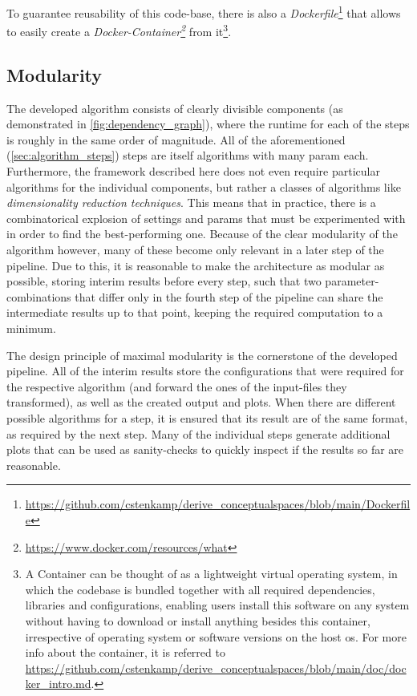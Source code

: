 To guarantee reusability of this code-base, there is also a \emph{Dockerfile}\footnote{{\url{https://github.com/cstenkamp/derive_conceptualspaces/blob/main/Dockerfile}}} that allows to easily create a \emph{Docker-Container\footnote{\url{https://www.docker.com/resources/what}}} from it\footnote{A Container can be thought of as a lightweight virtual operating system, in which the codebase is bundled together with all required dependencies, libraries and configurations, enabling users install this software on any system without having to download or install anything besides this container, irrespective of operating system or software versions on the host \acrshort{os}. For more info about the container, it is referred to \url{https://github.com/cstenkamp/derive_conceptualspaces/blob/main/doc/docker_intro.md}.}.

\subsection{Modularity}

The developed algorithm consists of clearly divisible components (as demonstrated in \autoref{fig:dependency_graph}), where the runtime for each of the steps is roughly in the same order of magnitude. All of the aforementioned (\autoref{sec:algorithm_steps}) steps are itself algorithms with many \gls{param} each. Furthermore, the framework described here does not even require particular algorithms for the individual components, but rather a classes of algorithms like \emph{dimensionality reduction techniques}. This means that in practice, there is a combinatorical explosion of settings and \glspl{param} that must be experimented with in order to find the best-performing one. Because of the clear modularity of the algorithm however, many of these become only relevant in a later step of the pipeline. Due to this, it is reasonable to make the architecture as modular as possible, storing interim results before every step, such that two parameter-combinations that differ only in \eg the fourth step of the pipeline can share the intermediate results up to that point, keeping the required computation to a minimum. 

The design principle of maximal modularity is the cornerstone of the developed pipeline. All of the interim results store the configurations that were required for the respective algorithm (and forward the ones of the input-files they transformed), as well as the created output and plots. When there are different possible algorithms for a step, it is ensured that its result are of the same format, as required by the next step. Many of the individual steps generate additional plots that can be used as sanity-checks to quickly inspect if the results so far are reasonable.

